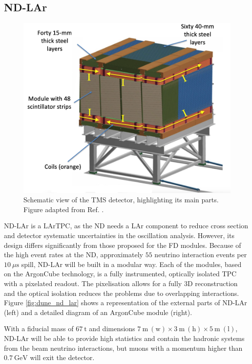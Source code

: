 \subsection{ND-LAr}

\begin{figure}[t]
	\centering
	\includegraphics[width=0.65\linewidth]{Images/DUNE/ND/nd_tms}
	\caption[Schematic view of the TMS detector, highlighting its main parts.]{Schematic view of the TMS detector, highlighting its main parts. Figure adapted from Ref. \cite{DUNE2020TDR1}.}
	\label{fig:dune_tms}
\end{figure}

ND-LAr is a LArTPC, as the ND needs a LAr component to reduce cross section and detector systematic uncertainties in the oscillation analysis. However, its design differs significantly from those proposed for the FD modules. Because of the high event rates at the ND, approximately $55$ neutrino interaction events per $10~\mu\mathrm{s}$ spill, ND-LAr will be built in a modular way. Each of the modules, based on the ArgonCube technology, is a fully instrumented, optically isolated TPC with a pixelated readout. The pixelisation allows for a fully 3D reconstruction and the optical isolation reduces the problems due to overlapping interactions. Figure \ref{fig:dune_nd_lar} shows a representation of the external parts of ND-LAr (left) and a detailed diagram of an ArgonCube module (right).

With a fiducial mass of $67~\mathrm{t}$ and dimensions $7~\mathrm{m} \ (\text{w}) \times 3~\mathrm{m} \ (\text{h}) \times 5~\mathrm{m} \ (\text{l})$, ND-LAr will be able to provide high statistics and contain the hadronic systems from the beam neutrino interactions, but muons with a momentum higher than $0.7~\mathrm{GeV}$ will exit the detector.

